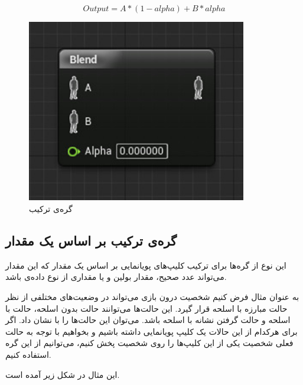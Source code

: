 \begin{equation}\label{eq:BlendNode}
	Output= A * (1-alpha) + B * alpha
\end{equation}

\cite{BlendNodeUnrealEngine}

\begin{figure}[ht]
	\centerline{\includegraphics[width=\textwidth,height=8cm,keepaspectratio]{Figures/Ch3/BlendNode.png}}\hfill
	\caption{ گره‌ی ترکیب }
	\label{fig:BlendNode}
\end{figure}

\subsection{ گره‌ی ترکیب بر اساس یک مقدار}

این نوع از گره‌ها برای ترکیب کلیپ‌های پویانمایی بر اساس یک مقدار 
که این مقدار می‌تواند عدد صحیح، مقدار بولین و یا مقداری از 
نوع داده‌ی 
باشد.

به عنوان مثال فرض کنیم شخصیت درون بازی می‌تواند در وضعیت‌های مختلفی از نظر
حالت مبارزه با اسلحه قرار گیرد. این حالت‌ها می‌توانند حالت بدون اسلحه، 
حالت با اسلحه و حالت گرفتن نشانه با اسلحه باشد.
می‌توان این حالت‌ها را با
نشان داد.
اگر برای هرکدام از این حالات یک کلیپ پویانمایی داشته باشیم و بخواهیم 
با توجه به حالت فعلی شخصیت یکی از این کلیپ‌ها را روی شخصیت پخش کنیم،
می‌توانیم از این گره استفاده کنیم.
\cite{BlendNodeUnrealEngine}

این مثال در شکل زیر آمده است.

